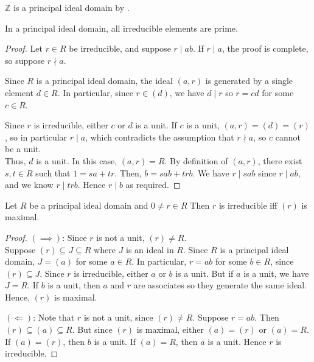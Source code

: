\begin{example}
	$\mathbb Z$ is a principal ideal domain by .
\end{example}

\begin{proposition} \label{prp:10.3}
	In a principal ideal domain, all irreducible elements are prime.
\end{proposition}

\begin{proof}
	Let $r \in R$ be irreducible, and suppose $r \mid ab$.
	If $r \mid a$, the proof is complete, so suppose $r \nmid a$.

	Since $R$ is a principal ideal domain, the ideal $(a,r)$ is generated by a single element $d \in R$.
	In particular, since $r \in (d)$, we have $d \mid r$ so $r = cd$ for some $c \in R$.

	Since $r$ is irreducible, either $c$ or $d$ is a unit.
	If $c$ is a unit, $(a,r) = (d) = (r)$, so in particular $r \mid a$, which contradicts the assumption that $r \nmid a$, so $c$ cannot be a unit. \\
	Thus, $d$ is a unit.
	In this case, $(a,r) = R$.
	By definition of $(a,r)$, there exist $s, t \in R$ such that $1 = sa + tr$.
	Then, $b = sab + trb$.
	We have $r \mid sab$ since $r \mid ab$, and we know $r \mid trb$.
	Hence $r \mid b$ as required.
\end{proof}

\begin{lemma} \label{lem:10.4}
	Let $R$ be a principal ideal domain and $0 \neq r \in R$
	Then $r$ is irreducible iff $(r)$ is maximal.
\end{lemma}

\begin{proof}
	$(\implies)$:
	Since $r$ is not a unit, $(r) \neq R$. \\
	Suppose $(r) \subseteq J \subseteq R$ where $J$ is an ideal in $R$.
	Since $R$ is a principal ideal domain, $J = (a)$ for some $a \in R$.
	In particular, $r = ab$ for some $b \in R$, since $(r) \subseteq J$.
	Since $r$ is irreducible, either $a$ or $b$ is a unit.
	But if $a$ is a unit, we have $J = R$.
	If $b$ is a unit, then $a$ and $r$ are associates so they generate the same ideal.
	Hence, $(r)$ is maximal.

	$(\Longleftarrow)$:
	Note that $r$ is not a unit, since $(r) \neq R$.
	Suppose $r = ab$.
	Then $(r) \subseteq (a) \subseteq R$.
	But since $(r)$ is maximal, either $(a) = (r)$ or $(a) = R$.
	If $(a) = (r)$, then $b$ is a unit.
	If $(a) = R$, then $a$ is a unit.
	Hence $r$ is irreducible.
\end{proof}

